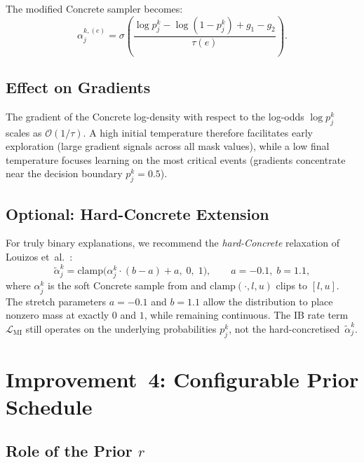 \documentclass[11pt,a4paper]{article}
\newcommand{\loss}{\mathcal{L}}
\begin{document}
The modified Concrete sampler becomes:
\begin{equation}
\label{eq:concrete_annealed}
\alpha_j^{k,(e)}
  = \sigma\!\left(
    \frac{\log p_j^k - \log(1 - p_j^k) + g_1 - g_2}{\tau(e)}
  \right).
\end{equation}

\subsection{Effect on Gradients}

The gradient of the Concrete log-density with respect to the log-odds
$\log p_j^k$ scales as $\mathcal{O}(1/\tau)$. A high initial
temperature therefore facilitates early exploration (large gradient
signals across all mask values), while a low final temperature focuses
learning on the most critical events (gradients concentrate near the
decision boundary $p_j^k = 0.5$).

\subsection{Optional: Hard-Concrete Extension}

For truly binary explanations, we recommend the
\emph{hard-Concrete} relaxation of Louizos et~al.~\cite{louizos2018deep}:
\begin{equation}
\label{eq:hard_concrete}
\tilde{\alpha}_j^k
  = \mathrm{clamp}\!\big(
    \alpha_j^k \cdot (b - a) + a,\; 0,\; 1
  \big),
  \qquad a = -0.1,\; b = 1.1,
\end{equation}
where $\alpha_j^k$ is the soft Concrete sample from
 and $\mathrm{clamp}(\cdot, l, u)$ clips
to $[l, u]$. The stretch parameters $a = -0.1$ and $b = 1.1$ allow
the distribution to place nonzero mass at exactly $0$ and $1$, while
remaining continuous. The IB rate term $\loss_{\text{MI}}$ still
operates on the underlying probabilities $p_j^k$, not the
hard-concretised~$\tilde{\alpha}_j^k$.

\section{Improvement~4: Configurable Prior Schedule}
\label{sec:prior_schedule}

\subsection{Role of the Prior $r$}
\end{document}
